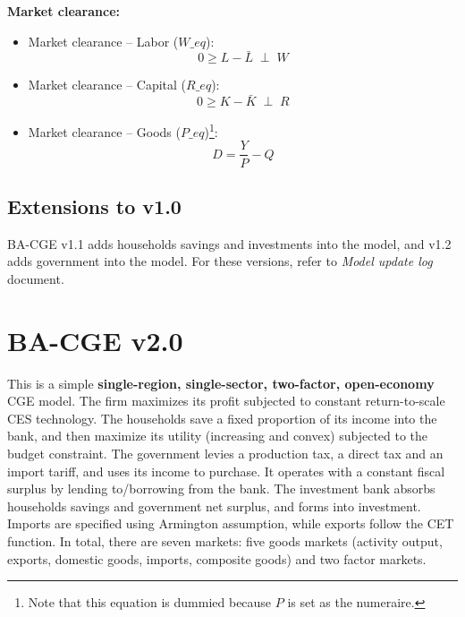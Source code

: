 \documentclass[12pt, a4paper]{article}
\numberwithin{equation}{section}
\numberwithin{figure}{section}
\numberwithin{table}{section}
\begin{document}
\textbf{Market clearance:}
\begin{itemize}
	\item Market clearance -- Labor (\(W\_eq\)): 
	\begin{equation}
		0\geq L-\bar{L}\; \perp\; W
	\end{equation}
	\item Market clearance -- Capital (\(R\_eq\)): 
	\begin{equation}
		0\geq K-\bar{K}\; \perp\; R
	\end{equation}
	\item Market clearance -- Goods (\(P\_eq\))\footnote{
	Note that this equation is dummied because \(P\) is set as the numeraire.}: 
	\begin{equation}
		D = \frac{Y}{P}-Q
	\end{equation}
\end{itemize}

\subsection{Extensions to v1.0}\label{v1.0-extensions}
BA-CGE v1.1 adds households savings and investments into the model, 
and v1.2 adds government into the model. 
For these versions, refer to \textit{Model update log} document. 

\clearpage

\section{BA-CGE v2.0} \label{BA-CGE v2.0}
This is a simple \textbf{single-region, single-sector, two-factor, open-economy} CGE model.
The firm maximizes its profit subjected to constant return-to-scale CES technology.
The households save a fixed proportion of its income into the bank,
and then maximize its utility (increasing and convex) subjected to the budget constraint.
The government levies a production tax, a direct tax and an import tariff, and uses its income to purchase.
It operates with a constant fiscal surplus by lending to/borrowing from the bank.
The investment bank absorbs households savings and government net surplus, and forms into investment.
Imports are specified using Armington assumption, while exports follow the CET function. 
In total, there are seven markets: five goods markets (activity output, exports, domestic goods, imports, composite goods) and two factor markets. 
\end{document}
